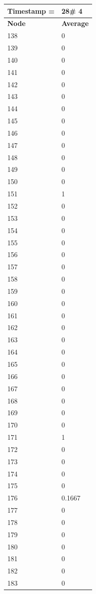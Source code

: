 \begin{tabular}{|l||l|}
\hline
\textbf{Timestamp =} & \textbf{28}\# 4\\\hline
	\textbf{Node} & \textbf{Average} \\ \hline
\hline
	138 & 0 \\ \hline
	139 & 0 \\ \hline
	140 & 0 \\ \hline
	141 & 0 \\ \hline
	142 & 0 \\ \hline
	143 & 0 \\ \hline
	144 & 0 \\ \hline
	145 & 0 \\ \hline
	146 & 0 \\ \hline
	147 & 0 \\ \hline
	148 & 0 \\ \hline
	149 & 0 \\ \hline
	150 & 0 \\ \hline
	151 & 1 \\ \hline
	152 & 0 \\ \hline
	153 & 0 \\ \hline
	154 & 0 \\ \hline
	155 & 0 \\ \hline
	156 & 0 \\ \hline
	157 & 0 \\ \hline
	158 & 0 \\ \hline
	159 & 0 \\ \hline
	160 & 0 \\ \hline
	161 & 0 \\ \hline
	162 & 0 \\ \hline
	163 & 0 \\ \hline
	164 & 0 \\ \hline
	165 & 0 \\ \hline
	166 & 0 \\ \hline
	167 & 0 \\ \hline
	168 & 0 \\ \hline
	169 & 0 \\ \hline
	170 & 0 \\ \hline
	171 & 1 \\ \hline
	172 & 0 \\ \hline
	173 & 0 \\ \hline
	174 & 0 \\ \hline
	175 & 0 \\ \hline
	176 & 0.1667 \\ \hline
	177 & 0 \\ \hline
	178 & 0 \\ \hline
	179 & 0 \\ \hline
	180 & 0 \\ \hline
	181 & 0 \\ \hline
	182 & 0 \\ \hline
	183 & 0 \\ \hline
\end{tabular}
